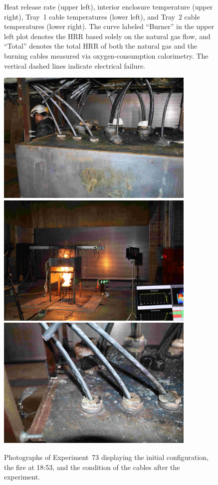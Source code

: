 \begin{figure}[H]
\caption[HRR and temperatures of Experiment 73]{Heat release rate (upper left), interior enclosure temperature (upper right), Tray~1 cable temperatures (lower left), and Tray~2 cable temperatures (lower right). The curve labeled ``Burner'' in the upper left plot denotes the HRR based solely on the natural gas flow, and ``Total'' denotes the total HRR of both the natural gas and the burning cables measured via oxygen-consumption calorimetry. The vertical dashed lines indicate electrical failure.}
\label{fig:Test_73}
\end{figure}

\begin{figure}[p]
\centering
\includegraphics[height=2.50in]{../FIGURES/Test_73_Photo_1} \\ \vspace{0.1in}
\includegraphics[height=2.50in]{../FIGURES/Test_73_Photo_2} \\ \vspace{0.1in}
\includegraphics[height=2.50in]{../FIGURES/Test_73_Photo_3}
\caption[Photographs of Experiment~73]{Photographs of Experiment~73 displaying the initial configuration, the fire at 18:53, and the condition of the cables after the experiment.}
\label{fig:Test_73_photos}
\end{figure}


